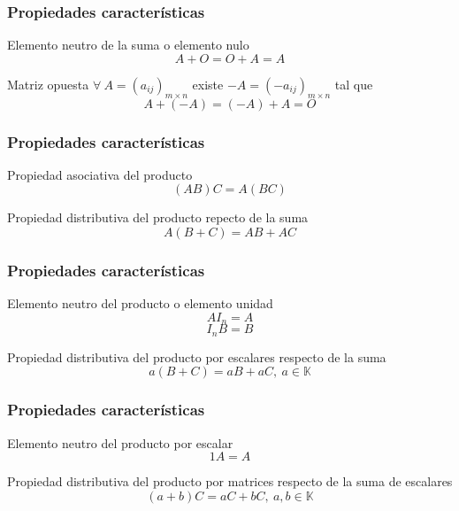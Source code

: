 \documentclass[aspectratio=169]{beamer}
\begin{document}
  
   \begin{frame}
  \frametitle{Propiedades caracter\'isticas}
  
   \begin{block}{Elemento neutro de la suma o elemento nulo}
   \[A+O = O+A = A\]
  \end{block}
  
  
     \begin{block}{Matriz opuesta}
   $\forall \ A = (a_{ij})_{m\times n}$ existe $-A = (-a_{ij})_{m\times n}$ tal que \[A+(-A) = (-A)+A = O\]
  \end{block}
 \end{frame}
 
 
 
   \begin{frame}
  \frametitle{Propiedades caracter\'isticas}
  
   \begin{block}{Propiedad asociativa del producto}
   \[(AB)C = A(BC)\]
  \end{block}
  
  
     \begin{block}{Propiedad distributiva del producto repecto de la suma}
   \[A(B+C) = AB+AC\]
  \end{block}
  
  
 \end{frame}
 
  
   \begin{frame}
  \frametitle{Propiedades caracter\'isticas}
  
   \begin{block}{Elemento neutro del producto o elemento unidad}
   \[AI_n = A \]
   \[I_nB = B\]
  \end{block}
  
  
     \begin{block}{Propiedad distributiva del producto por escalares respecto de la suma}
   \[a(B+C) = aB + aC,\ a\in \mathbb{K} \]
  \end{block}
  
  
 \end{frame}
 
   
   \begin{frame}
  \frametitle{Propiedades caracter\'isticas}
  
   \begin{block}{Elemento neutro del producto por escalar}
   \[1A = A \]
  \end{block}
  
  
     \begin{block}{Propiedad distributiva del producto por matrices respecto de la suma de escalares}
   \[(a+b)C = aC + bC, \ a,b\in\mathbb{K}\]
  \end{block}
  
  
 \end{frame}
 
\end{document}
